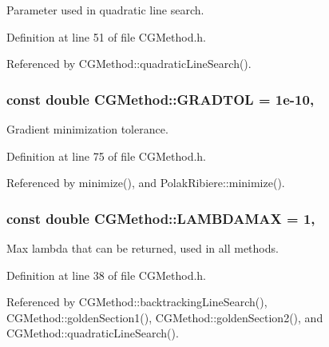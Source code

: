 Parameter used in quadratic line search. 



Definition at line 51 of file C\+G\+Method.\+h.



Referenced by C\+G\+Method\+::quadratic\+Line\+Search().

\hypertarget{classCGMethod_ad0118dc4da7526f196a4b4172bba9625}{
\subsubsection[{G\+R\+A\+D\+T\+O\+L}]{\setlength{\rightskip}{0pt plus 5cm}const double C\+G\+Method\+::\+G\+R\+A\+D\+T\+O\+L = 1e-\/10\hspace{0.3cm}{\ttfamily [protected]}, {\ttfamily [inherited]}}}\label{classCGMethod_ad0118dc4da7526f196a4b4172bba9625}


Gradient minimization tolerance. 



Definition at line 75 of file C\+G\+Method.\+h.



Referenced by minimize(), and Polak\+Ribiere\+::minimize().

\hypertarget{classCGMethod_a04127fd877e82fdf4f71cd3709581419}{
\subsubsection[{L\+A\+M\+B\+D\+A\+M\+A\+X}]{\setlength{\rightskip}{0pt plus 5cm}const double C\+G\+Method\+::\+L\+A\+M\+B\+D\+A\+M\+A\+X = 1\hspace{0.3cm}{\ttfamily [protected]}, {\ttfamily [inherited]}}}\label{classCGMethod_a04127fd877e82fdf4f71cd3709581419}


Max lambda that can be returned, used in all methods. 



Definition at line 38 of file C\+G\+Method.\+h.



Referenced by C\+G\+Method\+::backtracking\+Line\+Search(), C\+G\+Method\+::golden\+Section1(), C\+G\+Method\+::golden\+Section2(), and C\+G\+Method\+::quadratic\+Line\+Search().

